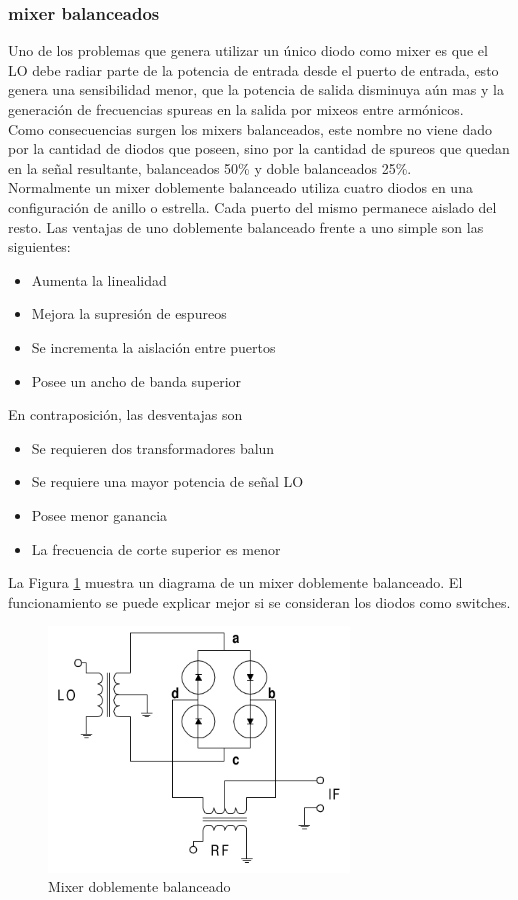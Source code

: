 \documentclass[a4paper,10pt]{article}
\begin{document}
	\subsubsection{mixer balanceados}
	\indent Uno de los problemas que genera utilizar un único diodo como mixer 
	es que el LO debe radiar parte de la potencia de entrada desde el puerto de 
	entrada, esto genera una sensibilidad menor, que la potencia de salida 
	disminuya aún mas y la generación de frecuencias spureas en la salida por 
	mixeos entre armónicos. \\
	\indent Como consecuencias surgen los mixers balanceados, este nombre no 
	viene dado por la cantidad de diodos que poseen, sino por la cantidad de 
	spureos que quedan en la señal resultante, balanceados 50\% y doble 
	balanceados 25\%. \\
	\indent Normalmente un mixer doblemente balanceado utiliza cuatro diodos en 
	una configuración de anillo o estrella. Cada puerto del mismo permanece
	aislado del resto. Las ventajas de uno doblemente balanceado frente a uno 
	simple son las siguientes:
	
	\begin{itemize}
		\item Aumenta la linealidad
		\item Mejora la supresión de espureos
		\item Se incrementa la aislación entre puertos
		\item Posee un ancho de banda superior
	\end{itemize}

	\indent En contraposición, las desventajas son

	\begin{itemize}
		\item Se requieren dos transformadores balun
		\item Se requiere una mayor potencia de señal LO
		\item Posee menor ganancia
		\item La frecuencia de corte superior es menor
	\end{itemize}

	\indent La Figura \ref{img:004} muestra un diagrama de un mixer doblemente 
	balanceado. El funcionamiento se puede explicar mejor si se consideran los 
	diodos como switches. \\
	
	\begin{figure}[!htb]
		\centering
		\includegraphics[width=8cm]{Images/DoubleBalancedMixer.png}
		\caption{Mixer doblemente balanceado}
		\label{img:004}
	\end{figure}
\end{document}
